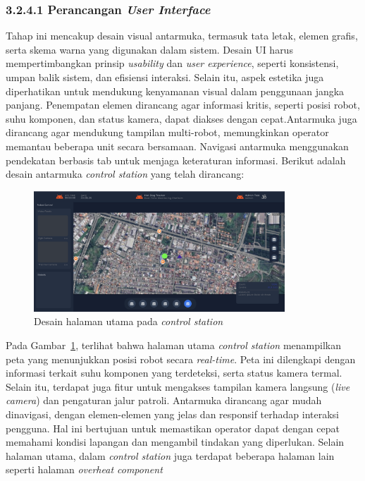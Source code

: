 \subsubsection{3.2.4.1 Perancangan \emph{User Interface}}

Tahap ini mencakup desain visual antarmuka, termasuk tata letak, elemen grafis, serta skema warna yang digunakan dalam sistem. Desain UI harus mempertimbangkan prinsip \emph{usability} dan \emph{user experience}, seperti konsistensi, umpan balik sistem, dan efisiensi interaksi. Selain itu, aspek estetika juga diperhatikan untuk mendukung kenyamanan visual dalam penggunaan jangka panjang. Penempatan elemen dirancang agar informasi kritis, seperti posisi robot, suhu komponen, dan status kamera, dapat diakses dengan cepat.Antarmuka juga dirancang agar mendukung tampilan multi-robot, memungkinkan operator memantau beberapa unit secara bersamaan. Navigasi antarmuka menggunakan pendekatan berbasis tab untuk menjaga keteraturan informasi. Berikut adalah desain antarmuka \emph{control station} yang telah dirancang:

\begin{figure}[H]
  \centering
  \includegraphics[width=0.84\textwidth]{gambar/bab3/home-fix.png}
  \caption{Desain halaman utama pada \emph{control station}}
  \label{fig:control-station-robot-main}
\end{figure}


Pada Gambar~\ref{fig:control-station-robot-main}, terlihat bahwa halaman utama \emph{control station} menampilkan peta yang menunjukkan posisi robot secara \emph{real-time}. Peta ini dilengkapi dengan informasi terkait suhu komponen yang terdeteksi, serta status kamera termal. Selain itu, terdapat juga fitur untuk mengakses tampilan kamera langsung (\emph{live camera}) dan pengaturan jalur patroli. Antarmuka dirancang agar mudah dinavigasi, dengan elemen-elemen yang jelas dan responsif terhadap interaksi pengguna. Hal ini bertujuan untuk memastikan operator dapat dengan cepat memahami kondisi lapangan dan mengambil tindakan yang diperlukan. Selain halaman utama, dalam \emph{control station} juga terdapat beberapa halaman lain seperti halaman \emph{overheat component}


